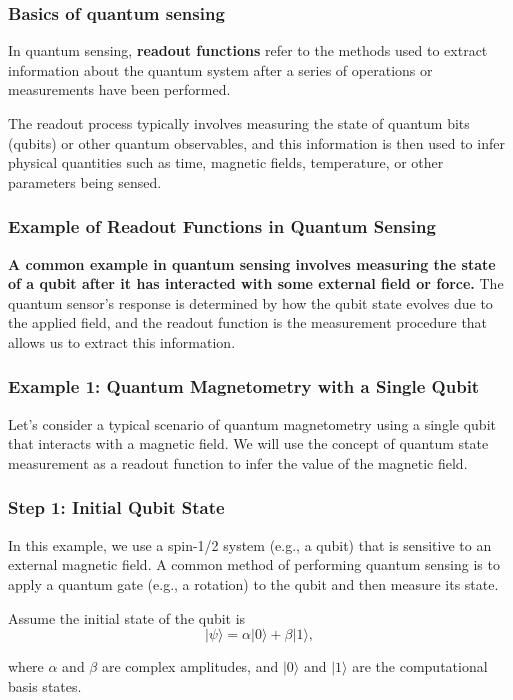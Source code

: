 \documentclass{beamer}
\begin{document}
\begin{frame}
\frametitle{Basics of quantum sensing}

\begin{block}{}
In quantum sensing, \textbf{readout functions} refer to the methods used to
extract information about the quantum system after a series of
operations or measurements have been performed.
\end{block} 

\begin{block}{}
The readout process
typically involves measuring the state of quantum bits (qubits) or
other quantum observables, and this information is then used to infer
physical quantities such as time, magnetic fields, temperature, or
other parameters being sensed.
\end{block}
\end{frame}

\begin{frame}
\frametitle{Example of Readout Functions in Quantum Sensing}

\begin{block}{}
\textbf{A common example in quantum sensing involves measuring the state of a
qubit after it has interacted with some external field or force.} The
quantum sensor’s response is determined by how the qubit state evolves
due to the applied field, and the readout function is the measurement
procedure that allows us to extract this information.
\end{block}
\end{frame}

\begin{frame}
\frametitle{Example 1: Quantum Magnetometry with a Single Qubit}

\begin{block}{}
Let’s consider a typical scenario of quantum magnetometry using a
single qubit that interacts with a magnetic field. We will use the
concept of quantum state measurement as a readout function to infer
the value of the magnetic field.
\end{block}
\end{frame}

\begin{frame}
\frametitle{Step 1: Initial Qubit State}

In this example, we use a spin-1/2 system (e.g., a qubit) that is
sensitive to an external magnetic field. A common method of performing
quantum sensing is to apply a quantum gate (e.g., a rotation) to the
qubit and then measure its state.

Assume the initial state of the qubit is
\[
\vert \psi \rangle = \alpha \vert 0\rangle + \beta |1\rangle,
\]

where $\alpha$ and $\beta$ are complex
amplitudes, and $\vert 0\rangle$ and $\vert 1\rangle$
are the computational basis
states.
\end{frame}
\end{document}
